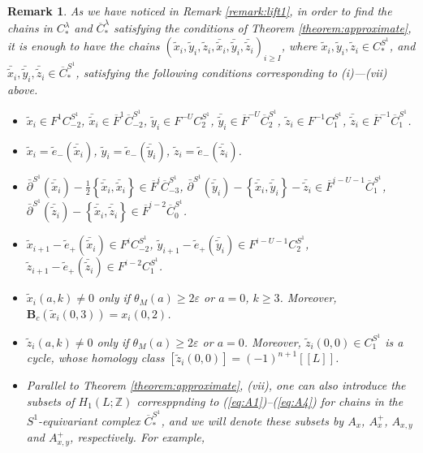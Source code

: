 \documentclass[a4paper]{article}
\newtheorem{remark}[theorem]{Remark}
\numberwithin{equation}{section}
\begin{document}
\begin{remark}\label{remark:lift2}
As we have noticed in Remark \ref{remark:lift1}, in order to find the chains in $C_\ast^\lambda$ and $\overline{C}_\ast^\lambda$ satisfying the conditions of Theorem \ref{theorem:approximate}, it is enough to have the chains $(\tilde{x}_i,\tilde{y}_i,\tilde{z}_i,\bar{\tilde{x}}_i,\bar{\tilde{y}}_i,\bar{\tilde{z}}_i)_{i\geq I}$, where $\tilde{x}_i,\tilde{y}_i,\tilde{z}_i\in C_\ast^{S^1}$, and $\bar{\tilde{x}}_i,\bar{\tilde{y}}_i,\bar{\tilde{z}}_i\in\overline{C}_\ast^{S^1}$, satisfying the following conditions corresponding to (i)---(vii) above.
\begin{itemize}
	\item[(i')] $\tilde{x}_i\in F^1C_{-2}^{S^1}$, $\bar{\tilde{x}}_i\in\overline{F}^1\overline{C}_{-2}^{S^1}$, $\tilde{y}_i\in F^{-U}C_2^{S^1}$, $\bar{\tilde{y}}_i\in\overline{F}^{-U}\overline{C}_2^{S^1}$, $\tilde{z}_i\in F^{-1}C_1^{S^1}$, $\bar{\tilde{z}}_i\in\overline{F}^{-1}\overline{C}_1^{S^1}$.
	\item[(ii')] $\tilde{x}_i=\tilde{e}_-(\bar{\tilde{x}}_i)$, $\tilde{y}_i=\tilde{e}_-(\bar{\tilde{y}}_i)$, $\tilde{z}_i=\tilde{e}_-(\bar{\tilde{z}}_i)$.
	\item[(iii')] $\bar{\partial}^{S^1}(\bar{\tilde{x}}_i)-\frac{1}{2}\left\{\bar{\tilde{x}}_i,\bar{\tilde{x}}_i\right\}\in \overline{F}^i\overline{C}_{-3}^{S^1}$, $\bar{\partial}^{S^1}(\bar{\tilde{y}}_i)-\left\{\bar{\tilde{x}}_i,\bar{\tilde{y}}_i\right\}-\bar{\tilde{z}}_i\in \overline{F}^{i-U-1}\overline{C}_1^{S^1}$, $\bar{\partial}^{S^1}(\bar{\tilde{z}}_i)-\left\{\bar{\tilde{x}}_i,\bar{\tilde{z}}_i\right\}\in \overline{F}^{i-2}\overline{C}_0^{S^1}$.
	\item[(iv')] $\tilde{x}_{i+1}-\tilde{e}_+(\bar{\tilde{x}}_i)\in F^iC_{-2}^{S^1}$, $\tilde{y}_{i+1}-\tilde{e}_+(\bar{\tilde{y}}_i)\in F^{i-U-1}C_2^{S^1}$, $\tilde{z}_{i+1}-\tilde{e}_+(\bar{\tilde{z}}_i)\in F^{i-2}C_1^{S^1}$.
	\item[(v')] $\tilde{x}_i(a,k)\neq0$ only if $\theta_M(a)\geq2\varepsilon$ or $a=0$, $k\geq3$. Moreover, $\mathbf{B}_c\left(\tilde{x}_i(0,3)\right)=x_i(0,2)$.
	\item[(vi')] $\tilde{z}_i(a,k)\neq0$ only if $\theta_M(a)\geq2\varepsilon$ or $a=0$. Moreover, $\tilde{z}_i(0,0)\in C_1^{S^1}$ is a cycle, whose homology class $\left[\tilde{z}_i(0,0)\right]=(-1)^{n+1}[\![L]\!]$.
	\item[(vii')] Parallel to Theorem \ref{theorem:approximate}, (vii), one can also introduce the subsets of $H_1(L;\mathbb{Z})$ corresppnding to (\ref{eq:A1})--(\ref{eq:A4}) for chains in the $S^1$-equivariant complex $\overline{C}_\ast^{S^1}$, and we will denote these subsets by $A_x$, $A_x^+$, $A_{x,y}$ and $A_{x,y}^+$, respectively. For example,

\end{itemize}
\end{remark}
\end{document}
